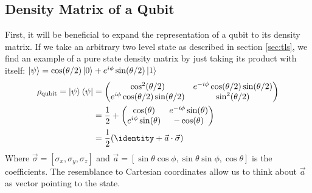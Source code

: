 \subsection{Density Matrix of a Qubit}
First, it will be beneficial to expand the representation of a qubit to its density matrix. If we take an arbitrary two level state as described in section \ref{sec:tls}, we find an example of a pure state density matrix by just taking its product with itself: $\ket{\psi} = \cos (\theta / 2) \ket{0} + e^{i\phi}\sin(\theta / 2)\ket{1}$
\begin{align}
    \rho_{\text{qubit}} = \ket{\psi}\bra{\psi} &= \begin{pmatrix}
        \cos^2(\theta/2)                        & e^{-i\phi}\cos(\theta/2)\sin(\theta/2) \\
        e^{i\phi}\cos(\theta/2)\sin(\theta/2)  & \sin^2(\theta/2)
    \end{pmatrix} \nonumber \\
    &= \frac12 + \begin{pmatrix}
        \cos(\theta)                       & e^{-i\phi}\sin(\theta) \\
        e^{i\phi}\sin(\theta)  & -\cos(\theta)   
    \end{pmatrix} \nonumber \\
    &= \frac12 (\identity + \Vec{a} \cdot \Vec{\sigma}) \label{eq:density_of_qubit}
\end{align}
Where $\Vec{\sigma} = [\sigma_x, \sigma_y, \sigma_z]$ and $\Vec{a} = [\sin{\theta}\cos{\phi}, \sin{\theta}\sin{\phi}, \cos{\theta}]$ is the coefficients\cite{krantz_quantum_2019}.  The resemblance to Cartesian coordinates allow us to think about $\Vec{a}$ as vector pointing to the state.

